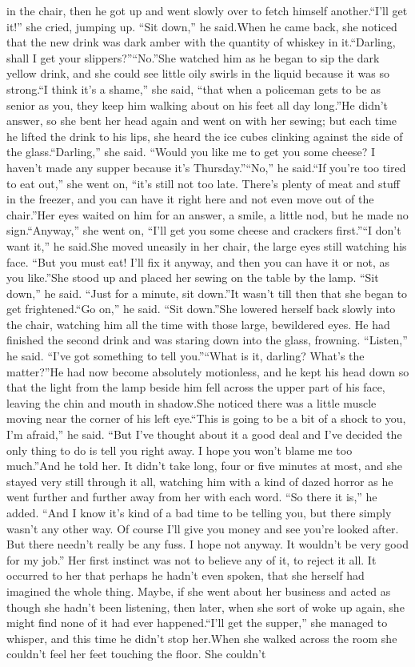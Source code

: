 \documentclass[11pt,a4paper]{article}
\begin{document}
{in the chair, then he got up and went slowly over to fetch himself another.“I’ll get it!” she cried, jumping up. “Sit down,” he said.When he came back, she noticed that the new drink was dark amber with the quantity of whiskey in it.“Darling, shall I get your slippers?”“No.”She watched him as he began to sip the dark yellow drink, and she could see little oily swirls in the liquid because it was so strong.“I think it’s a shame,” she said, “that when a policeman gets to be as senior as you, they keep him walking about on his feet all day long.”He didn’t answer, so she bent her head again and went on with her sewing; but each time he lifted the drink to his lips, she heard the ice cubes clinking against the side of the glass.“Darling,” she said. “Would you like me to get you some cheese? I haven’t made any supper because it’s Thursday.”“No,” he said.“If you’re too tired to eat out,” she went on, “it’s still not too late. There’s plenty of meat and stuff in the freezer, and you can have it right here and not even move out of the chair.”Her eyes waited on him for an answer, a smile, a little nod, but he made no sign.“Anyway,” she went on, “I’ll get you some cheese and crackers first.”“I don’t want it,” he said.She moved uneasily in her chair, the large eyes still watching his face. “But you must eat! I’ll fix it anyway, and then you can have it or not, as you like.”She stood up and placed her sewing on the table by the lamp. “Sit down,” he said. “Just for a minute, sit down.”It wasn’t till then that she began to get frightened.“Go on,” he said. “Sit down.”She lowered herself back slowly into the chair, watching him all the time with those large, bewildered eyes. He had finished the second drink and was staring down into the glass, frowning. “Listen,” he said. “I’ve got something to tell you.”“What is it, darling? What’s the matter?”He had now become absolutely motionless, and he kept his head down so that the light from the lamp beside him fell across the upper part of his face, leaving the chin and mouth in shadow.She noticed there was a little muscle moving near the corner of his left eye.“This is going to be a bit of a shock to you, I’m afraid,” he said. “But I’ve thought about it a good deal and I’ve decided the only thing to do is tell you right away. I hope you won’t blame me too much.”And he told her. It didn’t take long, four or five minutes at most, and she stayed very still through it all, watching him with a kind of dazed horror as he went further and further away from her with each word. “So there it is,” he added. “And I know it’s kind of a bad time to be telling you, but there simply wasn’t any other way. Of course I’ll give you money and see you’re looked after. But there needn’t really be any fuss. I hope not anyway. It wouldn’t be very good for my job.” Her first instinct was not to believe any of it, to reject it all. It occurred to her that perhaps he hadn’t even spoken, that she herself had imagined the whole thing. Maybe, if she went about her business and acted as though she hadn’t been listening, then later, when she sort of woke up again, she might find none of it had ever happened.“I’ll get the supper,” she managed to whisper, and this time he didn’t stop her.When she walked across the room she couldn’t feel her feet touching the floor. She couldn’t }
\end{document}
